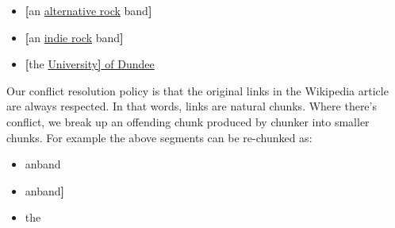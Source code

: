 \begin{itemize}
\item {\textbf{[}an {\uline{alternative rock}} band\textbf{]}}
\shrink\item {\textbf{[}an {\uline{indie rock}} band\textbf{]}}
\shrink\item {\textbf{[}the {\uline{University{\color{black}\textbf{]}}
of \lbb Dundee}\rbb}}
\end{itemize}

Our conflict resolution policy is that the original links in the
Wikipedia article are always respected. In that words,
links are natural chunks. Where there's conflict,
we break up an offending chunk produced by chunker into smaller chunks.
For example the above segments can be re-chunked as:

\begin{itemize}
\item {\lbb an\rbb {}\rbb \lbb band\rbb}
\shrink\item {\lbb an\rbb {}\rbb \lbb band\textbf{]}}
\shrink\item {\lbb the\rbb {}\rbb}
\end{itemize}



